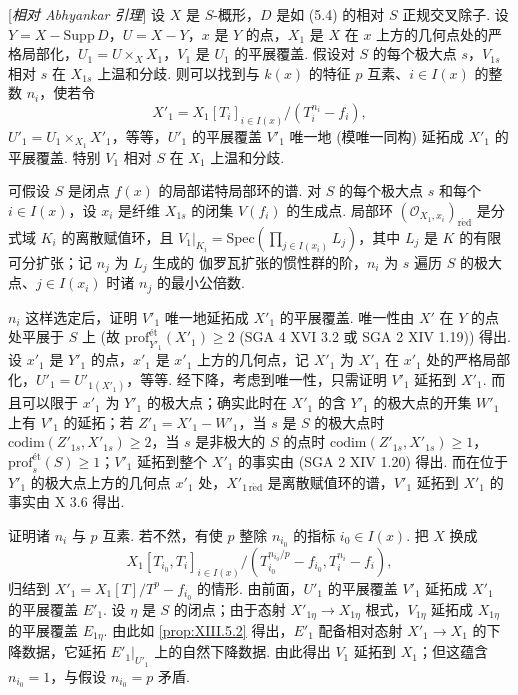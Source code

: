 \begin{proposition}\label{prop:XIII.5.5}
[\emph{相对 Abhyankar 引理}] 设 $X$ 是 $S$-概形，$D$ 是如 (5.4) 的相对 $S$ 正规交叉除子. 设 $Y = X - \mathrm{Supp}\, D$，$U = X - Y$，$x$ 是 $Y$ 的点，$X_1$ 是 $X$ 在 $x$ 上方的几何点处的严格局部化，$U_1 = U \times_X X_1$，$V_1$ 是 $U_1$ 的平展覆盖. 假设对 $S$ 的每个极大点 $s$，$V_{1s}$ 相对 $s$ 在 $X_{1s}$ 上温和分歧. 则可以找到与 $k(x)$ 的特征 $p$ 互素、$i \in I(x)$ 的整数 $n_i$，使若令
\[
X'_1 = X_1[T_i]_{i \in I(x)}/(T_i^{n_i} - f_i),
\]
$U'_1 = U_1 \times_{X_1} X'_1$，等等，$U'_1$ 的平展覆盖 $V'_1$ 唯一地 (模唯一同构) 延拓成 $X'_1$ 的平展覆盖. 特别 $V_1$ 相对 $S$ 在 $X_1$ 上温和分歧.
\end{proposition}

可假设 $S$ 是闭点 $f(x)$ 的局部诺特局部环的谱. 对 $S$ 的每个极大点 $s$ 和每个 $i \in I(x)$，设 $x_i$ 是纤维 $X_{1s}$ 的闭集 $V(f_i)$ 的生成点. 局部环 $(\mathcal{O}_{X_1, x_i})_{\mathrm{r\acute{e}d}}$ 是分式域 $K_i$ 的离散赋值环，且 $V_1|_{K_i} = \mathrm{Spec}(\prod_{j \in I(x_i)} L_j)$，其中 $L_j$ 是 $K$ 的有限可分扩张；记 $n_j$ 为 $L_j$ 生成的 伽罗瓦扩张的惯性群的阶，$n_i$ 为 $s$ 遍历 $S$ 的极大点、$j \in I(x_i)$ 时诸 $n_j$ 的最小公倍数.

$n_i$ 这样选定后，证明 $V'_1$ 唯一地延拓成 $X'_1$ 的平展覆盖. 唯一性由 $X'$ 在 $Y$ 的点处平展于 $S$ 上 (故 $\mathrm{prof}^{\mathrm{ét}}_{Y'_1}(X'_1) \geqslant 2$ (SGA 4 XVI 3.2 或 SGA 2 XIV 1.19)) 得出. 设 $x'_1$ 是 $Y'_1$ 的点，$x'_1$ 是 $x'_1$ 上方的几何点，记 $X'_1$ 为 $X'_1$ 在 $x'_1$ 处的严格局部化，$U'_1 = U'_{1(X'_1)}$，等等. 经下降，考虑到唯一性，只需证明 $V'_1$ 延拓到 $X'_1$. 而且可以限于 $x'_1$ 为 $Y'_1$ 的极大点；确实此时在 $X'_1$ 的含 $Y'_1$ 的极大点的开集 $W'_1$ 上有 $V'_1$ 的延拓；若 $Z'_1 = X'_1 - W'_1$，当 $s$ 是 $S$ 的极大点时 $\mathrm{codim}(Z'_{1s}, X'_{1s}) \geqslant 2$，当 $s$ 是非极大的 $S$ 的点时 $\mathrm{codim}(Z'_{1s}, X'_{1s}) \geqslant 1$，$\mathrm{prof}^{\mathrm{ét}}_s(S) \geqslant 1$；$V'_1$ 延拓到整个 $X'_1$ 的事实由 (SGA 2 XIV 1.20) 得出. 而在位于 $Y'_1$ 的极大点上方的几何点 $x'_1$ 处，$X'_{1\,\mathrm{r\acute{e}d}}$ 是离散赋值环的谱，$V'_1$ 延拓到 $X'_1$ 的事实由 X 3.6 得出.

证明诸 $n_i$ 与 $p$ 互素. 若不然，有使 $p$ 整除 $n_{i_0}$ 的指标 $i_0 \in I(x)$. 把 $X$ 换成
\[
X_1[T_{i_0}, T_i]_{i \in I(x)}/(T_{i_0}^{n_{i_0}/p} - f_{i_0}, T_i^{n_i} - f_i),
\]
归结到 $X'_1 = X_1[T]/T^p - f_{i_0}$ 的情形. 由前面，$U'_1$ 的平展覆盖 $V'_1$ 延拓成 $X'_1$ 的平展覆盖 $E'_1$. 设 $\eta$ 是 $S$ 的闭点；由于态射 $X'_{1\eta} \to X_{1\eta}$ 根式，$V_{1\eta}$ 延拓成 $X_{1\eta}$ 的平展覆盖 $E_{1\eta}$. 由此如 \ref{prop:XIII.5.2} 得出，$E'_1$ 配备相对态射 $X'_1 \to X_1$ 的下降数据，它延拓 $E'_1|_{U'_1}$ 上的自然下降数据. 由此得出 $V_1$ 延拓到 $X_1$；但这蕴含 $n_{i_0} = 1$，与假设 $n_{i_0} = p$ 矛盾.

